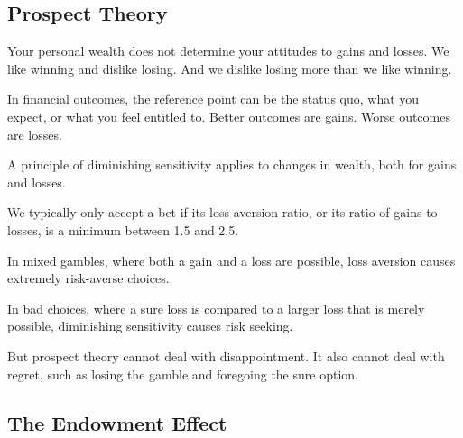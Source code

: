 \subsection*{Prospect Theory}

\bit
\item Your personal wealth does not determine your attitudes to gains and losses. We like winning and dislike losing.
And we dislike losing more than we like winning.
\item In financial outcomes, the reference point can be the status quo, what you expect, or what you feel entitled to.
Better outcomes are gains. Worse outcomes are losses.
\item A principle of diminishing sensitivity applies to changes in wealth, both for gains and losses.
\item We typically only accept a bet if its loss aversion ratio, or its ratio of gains to losses, is a minimum
between 1.5 and 2.5.
\item In mixed gambles, where both a gain and a loss are possible, loss aversion causes extremely risk-averse choices.
\item In bad choices, where a sure loss is compared to a larger loss that is merely possible, diminishing sensitivity
causes risk seeking.
\item But prospect theory cannot deal with disappointment. It also cannot deal with regret, such as losing the gamble
and foregoing the sure option.
\eit

\subsection*{The Endowment Effect}


